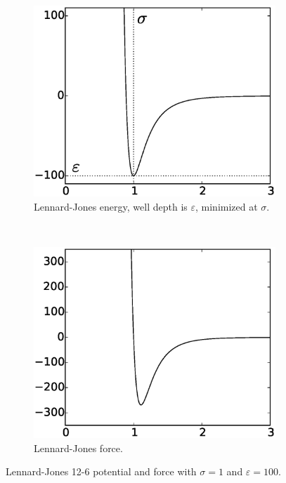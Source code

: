 	\begin{figure}[t!]
		\centering
		\begin{subfigure}[t]{.5\textwidth}
			\centering
			\includegraphics[scale=.5]{./fig/ch2/lj_e.eps}
			\caption{Lennard-Jones energy, well depth is $\varepsilon$, minimized at $\sigma$. \label{subfig:LJEnergy}}
		\end{subfigure}%
		~
		\begin{subfigure}[t]{.5\textwidth}
			\centering
			\includegraphics[scale=.5]{./fig/ch2/lj_f.eps}
			\caption{Lennard-Jones force. \label{subfig:LJForce}}
		\end{subfigure}		
		\caption{Lennard-Jones 12-6 potential and force with $\sigma = 1$ and $\varepsilon = 100$.\label{fig:LJ}}	
	\end{figure}

